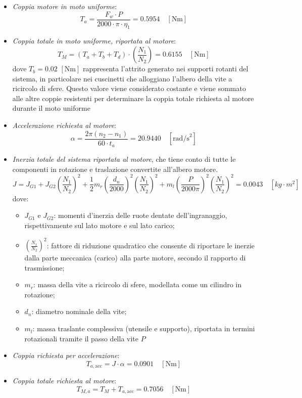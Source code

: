 \documentclass{article}
\begin{document}
\begin{itemize}
      
    \item \textit{Coppia motore in moto uniforme}:
    \[
    T_a = \frac{F_w \cdot P}{2000 \cdot \pi \cdot \eta_1}=0.5954 \quad [\text{Nm}]
    \]
    \item \textit{Coppia totale in moto uniforme, riportata al motore}:
    \[
    T_M = (T_a + T_b + T_d) \cdot \left( \frac{N_1}{N_2} \right)=0.6155\quad [\text{Nm}]
    \]
    \hspace{0.2cm} dove $T_b = 0.02$ $[\text{Nm}]$ rappresenta l'attrito generato nei supporti rotanti del sistema, in particolare nei cuscinetti che alloggiano l'albero della vite a ricircolo di sfere. Questo valore viene considerato costante e viene sommato alle altre coppie resistenti per determinare la coppia totale richiesta al motore durante il moto uniforme


    \item \textit{Accelerazione richiesta al motore}:
    \[
    \alpha = \frac{2 \pi (n_2 - n_1)}{60 \cdot t_a}=20.9440 \quad [\text{rad/s}^2]
    \]
% 
    \item \textit{Inerzia totale del sistema riportata al motore}, che tiene conto di tutte le componenti in rotazione e traslazione convertite all’albero motore. 
    \[
    J = J_{G1} + J_{G2} \left( \frac{N_1}{N_2} \right)^2 +
    \frac{1}{2} m_r \left( \frac{d_n}{2000} \right)^2 \left( \frac{N_1}{N_2} \right)^2 +
    m_l \left( \frac{P}{2000 \pi} \right)^2 \left( \frac{N_1}{N_2} \right)^2=0.0043\quad [{kg\cdot m^{2}}]
    \]
    dove:
    \begin{itemize}
    \item $J_{G1}$ e $J_{G2}$: momenti d'inerzia delle ruote dentate dell'ingranaggio, rispettivamente sul lato motore e sul lato carico;
    \item $\left(\frac{N_1}{N_2}\right)^2$: fattore di riduzione quadratico che consente di riportare le inerzie dalla parte meccanica (carico) alla parte motore, secondo il rapporto di trasmissione;
    \item $m_r$: massa della vite a ricircolo di sfere, modellata come un cilindro in rotazione;
    \item $d_n$: diametro nominale della vite;
    \item $m_l$: massa traslante complessiva (utensile e supporto), riportata in termini rotazionali tramite il passo della vite $P$
    \end{itemize}
    \item \textit{Coppia richiesta per accelerazione}:
    \[
    T_{a,\text{acc}} = J \cdot \alpha = 0.0901\quad [\text{Nm}]
    \]

    \item \textit{Coppia totale richiesta al motore}:
    \[
    T_{M,a} = T_M + T_{a,\text{acc}}=0.7056 \quad [\text{Nm}]
    \]
\end{itemize}
\end{document}
